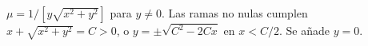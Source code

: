 $\mu=1/[y\sqrt{x^2+y^2}]$ para $y\ne0$. Las ramas no nulas cumplen $x+\sqrt{x^2+y^2}=C>0$, o $y=\pm\sqrt{C^2-2Cx}$ en $x<C/2$. Se añade $y=0$.
